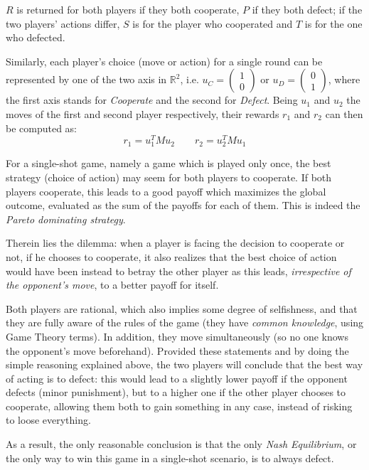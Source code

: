 \documentclass[journal,10pt,twoside]{IEEEtran}
\begin{document}
$R$ is returned for both players if they both cooperate, $P$ if they both defect; if the two players' actions differ, $S$ is for the player who cooperated and $T$ is for the one who defected.

Similarly, each player's choice (move or action) for a single round can be represented by one of the two axis in $\mathbb{R}^2$, i.e. $u_C=\begin{pmatrix} 1 \\ 0 \end{pmatrix}$ or $u_D=\begin{pmatrix} 0 \\ 1 \end{pmatrix}$, where the first axis stands for \textit{Cooperate} and the second for \textit{Defect}. Being $u_1$ and $u_2$ the moves of the first and second player respectively, their rewards $r_1$ and $r_2$ can then be computed as:
$$
r_1 = u_1^T M u_2
\quad
\quad
r_2 = u_2^T M u_1
$$

For a single-shot game, namely a game which is played only once, the best strategy (choice of action) may seem for both players to cooperate. If both players cooperate, this leads to a good payoff which maximizes the global outcome, evaluated as the sum of the payoffs for each of them. This is indeed the \textit{Pareto dominating strategy}.

Therein lies the dilemma: when a player is facing the decision to cooperate or not, if he chooses to cooperate, it also realizes that the best choice of action would have been instead to betray the other player as this leads, \textit{irrespective of the opponent's move}, to a better payoff for itself.

Both players are rational, which also implies some degree of selfishness, and that they are fully aware of the rules of the game (they have \textit{common knowledge}, using Game Theory terms). In addition, they move simultaneously (so no one knows the opponent's move beforehand). Provided these statements and by doing the simple reasoning explained above, the two players will conclude that the best way of acting is to defect: this would lead to a slightly lower payoff if the opponent defects (minor punishment), but to a higher one if the other player chooses to cooperate, allowing them both to gain something in any case, instead of risking to loose everything.

As a result, the only reasonable conclusion is that the only \textit{Nash Equilibrium}, or the only way to win this game in a single-shot scenario, is to always defect.
\end{document}
